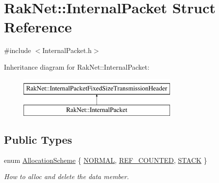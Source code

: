 \hypertarget{struct_rak_net_1_1_internal_packet}{\section{Rak\-Net\-:\-:Internal\-Packet Struct Reference}
\label{struct_rak_net_1_1_internal_packet}
}


{\ttfamily \#include $<$Internal\-Packet.\-h$>$}

Inheritance diagram for Rak\-Net\-:\-:Internal\-Packet\-:\begin{figure}[H]
\begin{center}
\leavevmode
\includegraphics[height=2.000000cm]{struct_rak_net_1_1_internal_packet}
\end{center}
\end{figure}
\subsection*{Public Types}
\begin{DoxyCompactItemize}
\item 
enum \hyperlink{struct_rak_net_1_1_internal_packet_a902a05c67f6c8f288e33a9fb0015e196}{Allocation\-Scheme} \{ \hyperlink{struct_rak_net_1_1_internal_packet_a902a05c67f6c8f288e33a9fb0015e196a9ca3b8805a0dc8d663e7fa4d4e3c9d07}{N\-O\-R\-M\-A\-L}, 
\hyperlink{struct_rak_net_1_1_internal_packet_a902a05c67f6c8f288e33a9fb0015e196aa717b2fd02a6aea55a4a14bb7a1bd0e2}{R\-E\-F\-\_\-\-C\-O\-U\-N\-T\-E\-D}, 
\hyperlink{struct_rak_net_1_1_internal_packet_a902a05c67f6c8f288e33a9fb0015e196ae06da879d548a1826a18a1c9cbc3b9ca}{S\-T\-A\-C\-K}
 \}
\begin{DoxyCompactList}\small\item\em How to alloc and delete the data member. \end{DoxyCompactList}\end{DoxyCompactItemize}
